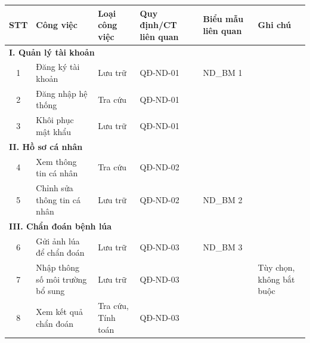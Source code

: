 \documentclass[12pt,a4paper]{article}
\begin{document}
\begin{longtable}{|c|l|l|l|l|p{3.5cm}|}
    \hline
    \rowcolor{headerblue}
    \textbf{STT} & \textbf{Công việc}               & \textbf{Loại công việc} & \textbf{Quy định/CT liên quan} & \textbf{Biểu mẫu liên quan} & \textbf{Ghi chú}         \\
    \hline
    \endhead
    \multicolumn{6}{|l|}{\cellcolor{notegreen}\textbf{I. Quản lý tài khoản}}                                                                                            \\
    \hline
    1            & Đăng ký tài khoản                & Lưu trữ                 & QĐ-ND-01                       & ND\_BM 1                    &                          \\
    \hline
    2            & Đăng nhập hệ thống               & Tra cứu                 & QĐ-ND-01                       &                             &                          \\
    \hline
    3            & Khôi phục mật khẩu               & Lưu trữ                 & QĐ-ND-01                       &                             &                          \\
    \hline
    \multicolumn{6}{|l|}{\cellcolor{notegreen}\textbf{II. Hồ sơ cá nhân}}                                                                                               \\
    \hline
    4            & Xem thông tin cá nhân            & Tra cứu                 & QĐ-ND-02                       &                             &                          \\
    \hline
    5            & Chỉnh sửa thông tin cá nhân      & Lưu trữ                 & QĐ-ND-02                       & ND\_BM 2                    &                          \\
    \hline
    \multicolumn{6}{|l|}{\cellcolor{notegreen}\textbf{III. Chẩn đoán bệnh lúa}}                                                                                         \\
    \hline
    6            & Gửi ảnh lúa để chẩn đoán         & Lưu trữ                 & QĐ-ND-03                       & ND\_BM 3                    &                          \\
    \hline
    7            & Nhập thông số môi trường bổ sung & Lưu trữ                 & QĐ-ND-03                       &                             & Tùy chọn, không bắt buộc \\
    \hline
    8            & Xem kết quả chẩn đoán            & Tra cứu, Tính toán      & QĐ-ND-03                       &                             &                          \\

\end{longtable}
\end{document}
